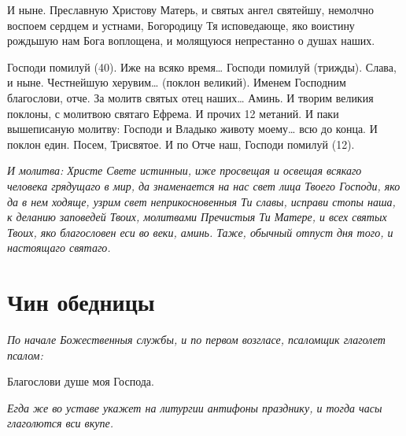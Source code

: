 И ныне. Преславную Христову Матерь, и святых ангел святейшу, немолчно воспоем сердцем и устнами, Богородицу Тя исповедающе, яко воистину рождьшую нам Бога воплощена, и молящуюся непрестанно о душах наших. 

Господи помилуй (40). Иже на всяко время… Господи помилуй (трижды). Слава, и ныне. Честнейшую херувим… (поклон великий). Именем Господним благослови, отче. За молитв святых отец наших… Аминь. И творим великия поклоны, с молитвою святаго Ефрема. И прочих 12 метаний. И паки вышеписаную молитву: Господи и Владыко животу моему… всю до конца. И поклон един. Посем, Трисвятое. И по Отче наш, Господи помилуй (12).


\itshape И молитва:\normalfont{} Христе Свете истинныи, иже просвещая и освещая всякаго человека грядущаго в мир, да знаменается на нас свет лица Твоего Господи, яко да в нем ходяще, узрим свет неприкосновенныя Ти славы, исправи стопы наша, к деланию заповедей Твоих, молитвами Пречистыя Ти Матере, и всех святых Твоих, яко благословен еси во веки, аминь. Таже, обычный отпуст дня того, и настоящаго святаго.


\section{Чин обедницы}
 


\itshape По начале Божественныя службы, и по первом возгласе, псаломщик глаголет псалом:\normalfont{}


Благослови душе моя Господа. 

\itshape Егда же во уставе укажет на литургии антифоны празднику, и тогда часы глаголются вси вкупе.\normalfont{}




